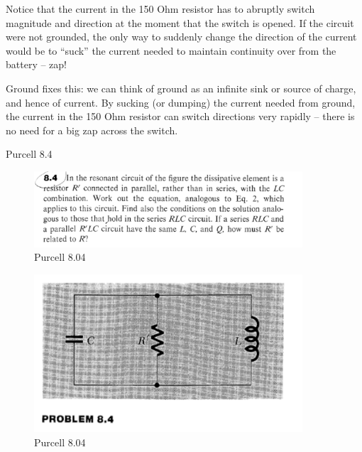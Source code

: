 \documentclass[makesolutionspdf]{esg8022pset}
\begin{document}
\begin{solution}
Notice that the current in the 150 Ohm resistor has to abruptly switch
magnitude and direction at the moment that the switch is opened. If
the circuit were not grounded, the only way to suddenly change the
direction of the current would be to ``suck'' the current needed to
maintain continuity over from the battery -- zap!

Ground fixes this: we can think of ground as an infinite sink or
source of charge, and hence of current. By sucking (or dumping) the
current needed from ground, the current in the 150 Ohm resistor can
switch directions very rapidly -- there is no need for a big zap
across the switch.


\end{solution}

\begin{problem}{Purcell 8.4}
\begin{figure}[H]
    \centering
    \includegraphics[width = 10cm]{pu804}
    \caption{Purcell 8.04}
  \end{figure}
  
  \begin{figure}[H]
    \centering
    \includegraphics[width = 10cm]{figpu804}
    \caption{Purcell 8.04}
  \end{figure}
  
\end{problem}
\end{document}
